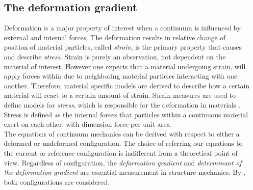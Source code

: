 \begin{appendices}
\chapter{The deformation gradient}
\label{appendix:defgrad}
Deformation is a major property of interest when a continuum is influenced by external and internal forces. The deformation results in relative change of position of material particles, called \textit{strain}, is the primary property that causes and describe \textit{stress}. Strain is purely an observation, not dependent on the material of interest. However one expects that a material undergoing strain, will apply forces within due to neighboring material particles interacting with one another. Therefore, material specific models are derived to describe how a certain material will react to a certain amount of strain. Strain measures are used to define models for \textit{stress}, which is responsible for the deformation in materials \cite{Holzapfel2000}. Stress is defined as the internal forces that particles within a continuous material exert on each other, with dimension force per unit area. \\
The equations of continuum mechanics can be derived with respect to either a deformed or undeformed configuration. The choice of referring our equations to the current or reference configuration is indifferent from a theoretical point of view. Regardless of configuration, the \textit{deformation gradient} and \textit{determinant of the deformation gradient} are essential measurement in structure mechanics. 
By \cite{Richter2016}, both configurations are considered.

\end{appendices}
